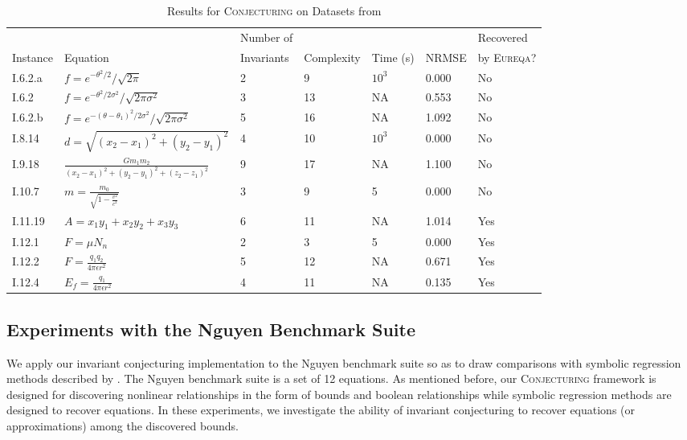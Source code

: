 \documentclass[ijds,nonblindrev]{informs-ijds}
\begin{document}
\begin{table}
{\footnotesize
\caption{\label{aif}Results for \textsc{Conjecturing} on Datasets from \citep{UdrescuTegmark20}}
\begin{tabular}{lllllll}
         &          &  Number of  &            &          &       & Recovered\\
Instance & Equation &  Invariants & Complexity & Time (s) & NRMSE & by \textsc{Eureqa}? \\
\hline\hline
I.6.2.a & $f=e^{-\theta^2/2}/\sqrt{2\pi}$                           & 2 & 9  & $10^3$ & 0.000 & No\\
I.6.2 & $f=e^{-\theta^2/2\sigma^2}/\sqrt{2\pi\sigma^2}$             & 3 & 13 & NA     & 0.553 & No\\
I.6.2.b & $f=e^{-(\theta-\theta_1)^2/2\sigma^2}/\sqrt{2\pi\sigma^2}$& 5 & 16 & NA     & 1.092 & No\\
I.8.14 & $d=\sqrt{(x_2-x_1)^2+(y_2-y_1)^2}$                         & 4 & 10 & $10^3$ & 0.000 & No\\
I.9.18 & $\frac{Gm_1m_2}{(x_2-x_1)^2+(y_2-y_1)^2+(z_2-z_1)^2}$      & 9 & 17 & NA     & 1.100 & No\\
I.10.7 & $m=\frac{m_0}{\sqrt{1-\frac{v^2}{c^2}}}$                   & 3 & 9 & 5      & 0.000 & No \\
I.11.19 & $A=x_1y_1+x_2y_2+x_3y_3$                                  & 6 & 11 & NA     & 1.014 & Yes\\
I.12.1 & $F=\mu N_n$                                                & 2 & 3  & 5      & 0.000 & Yes\\
I.12.2 & $F=\frac{q_1q_2}{4\pi\epsilon r^2}$                        & 5 & 12 & NA     & 0.671 & Yes\\
I.12.4  & $E_f = \frac{q_1}{4\pi\epsilon r^2}$                      & 4 & 11 & NA     & 0.135 & Yes \\ \hline
\end{tabular}}
\end{table}


\subsection{Experiments with the Nguyen Benchmark Suite \cite{nguyen}}
\label{nguyensec}
We apply our invariant conjecturing implementation to the Nguyen benchmark suite \citep{nguyen} so as to draw comparisons with symbolic regression methods described by \cite{petersen}.  The Nguyen benchmark suite is a set of 12 equations.  As mentioned before, our \textsc{Conjecturing} framework is designed for discovering nonlinear relationships in the form of bounds and boolean relationships while symbolic regression methods are designed to recover equations.  In these experiments, we investigate the ability of invariant conjecturing to recover equations (or approximations) among the discovered bounds.  
\end{document}
